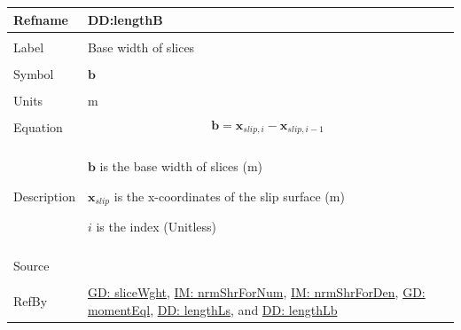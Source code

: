 \documentclass[12pt]{article}
\begin{document}
\noindent \begin{minipage}{\textwidth}
          \begin{tabular}{>{\raggedright}p{}>{\raggedright\arraybackslash}p{}}
          \toprule \textbf{Refname} & \textbf{DD:lengthB}
          \label{DD:lengthB}
          \\ \midrule \\
          Label & Base width of slices
          \\ \midrule \\
          Symbol & $\mathbf{b}$
          \\ \midrule \\
          Units & m
          \\ \midrule \\
          Equation & \begin{displaymath}
                     \mathbf{b}={\mathbf{x}_{slip,i}}-{\mathbf{x}_{slip,i-1}}
                     \end{displaymath}
          \\ \midrule \\
          Description & \begin{symbDescription}
                        \item{$\mathbf{b}$ is the base width of slices (m)}
                        \item{${\mathbf{x}_{slip}}$ is the x-coordinates of the slip surface (m)}
                        \item{$i$ is the index (Unitless)}
                        \end{symbDescription}
          \\ \midrule \\
          Source & \cite{fredlund1977}
          \\ \midrule \\
          RefBy & \hyperref[GD:sliceWght]{GD: sliceWght}, \hyperref[IM:nrmShrForNum]{IM: nrmShrForNum}, \hyperref[IM:nrmShrForDen]{IM: nrmShrForDen}, \hyperref[GD:momentEql]{GD: momentEql}, \hyperref[DD:lengthLs]{DD: lengthLs}, and \hyperref[DD:lengthLb]{DD: lengthLb}
          \\ \bottomrule
          \end{tabular}
          \end{minipage}
\par~
\end{document}
